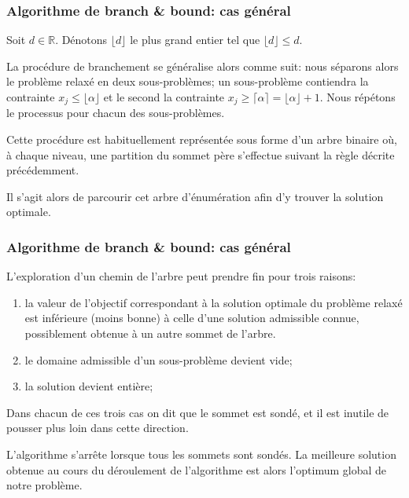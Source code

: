 \documentclass[usepdftitle=false]{beamer}
\begin{document}
\begin{frame}
\frametitle{Algorithme de branch \& bound: cas général}

Soit $d \in \mathbb{R}$. Dénotons $\lfloor d \rfloor$ le plus grand entier tel que $\lfloor d \rfloor \leq d$.

\mbox{}
La procédure de branchement se généralise alors comme suit: nous séparons alors le problème relaxé en deux sous-problèmes;
un sous-problème contiendra la contrainte $x_j \leq \lfloor \alpha \rfloor$ et le second la contrainte $x_j \geq \lceil \alpha \rceil  = \lfloor \alpha \rfloor + 1$.
Nous répétons le processus pour chacun des sous-problèmes.

\mbox{}

Cette procédure est habituellement représentée sous forme
d'un arbre binaire où, à chaque niveau, une partition du sommet père s'effectue suivant la règle décrite précédemment.

\mbox{}

Il s'agit alors de parcourir cet arbre d'énumération afin d'y trouver la solution optimale.

\end{frame}

\begin{frame}
\frametitle{Algorithme de branch \& bound: cas général}

L'exploration d'un chemin de l'arbre peut prendre fin pour trois raisons:
\begin{enumerate}
\item
la valeur de l'objectif correspondant à la solution optimale du problème relaxé est inférieure (moins bonne) à celle d'une solution admissible connue, possiblement obtenue à un autre sommet de l'arbre.
\item
le domaine admissible d'un sous-problème devient vide;
\item
la solution devient entière;
\end{enumerate}
Dans chacun de ces trois cas on dit que le sommet est sondé, et il est inutile de pousser plus loin dans cette direction.

\mbox{}

L'algorithme s'arrête lorsque tous les sommets sont sondés.
La meilleure solution obtenue au cours du déroulement de l'algorithme est alors l'optimum global de notre problème.

\end{frame}
\end{document}
